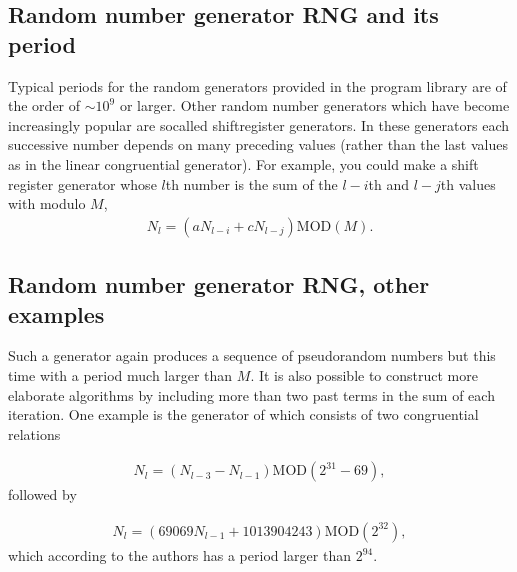 \documentclass[letterpaper,10pt,english]{sphinxmanual}
\begin{document}
\subsection{Random number generator RNG and its period}
\label{\detokenize{chapter2:random-number-generator-rng-and-its-period}}
Typical periods for the random generators provided in the program library
are of the order of \(\sim 10^9\) or larger. Other random number generators which have
become increasingly popular are so\sphinxhyphen{}called shift\sphinxhyphen{}register generators.
In these generators each successive number depends on many preceding
values (rather than the last values as in the linear congruential
generator).
For example, you could make a shift register generator whose \(l\)th
number is the sum of the \(l-i\)th and \(l-j\)th values with modulo \(M\),
\begin{equation*}
\begin{split}
N_l=(aN_{l-i}+cN_{l-j})\mathrm{MOD}(M).
\end{split}
\end{equation*}

\subsection{Random number generator RNG, other examples}
\label{\detokenize{chapter2:random-number-generator-rng-other-examples}}
Such a generator again produces a sequence of pseudorandom numbers
but this time with a period much larger than \(M\).
It is also possible to construct more elaborate algorithms by including
more than two past terms in the sum of each iteration.
One example is the generator of 
which consists of two congruential relations




\begin{equation*}
\begin{split}
\begin{equation}
   N_l=(N_{l-3}-N_{l-1})\mathrm{MOD}(2^{31}-69),
\label{eq:mz1} \tag{12}
\end{equation}
\end{split}
\end{equation*}
followed by




\begin{equation*}
\begin{split}
\begin{equation}
   N_l=(69069N_{l-1}+1013904243)\mathrm{MOD}(2^{32}),
\label{eq:mz2} \tag{13}
\end{equation}
\end{split}
\end{equation*}
which according to the authors has a period larger than \(2^{94}\).
\end{document}
